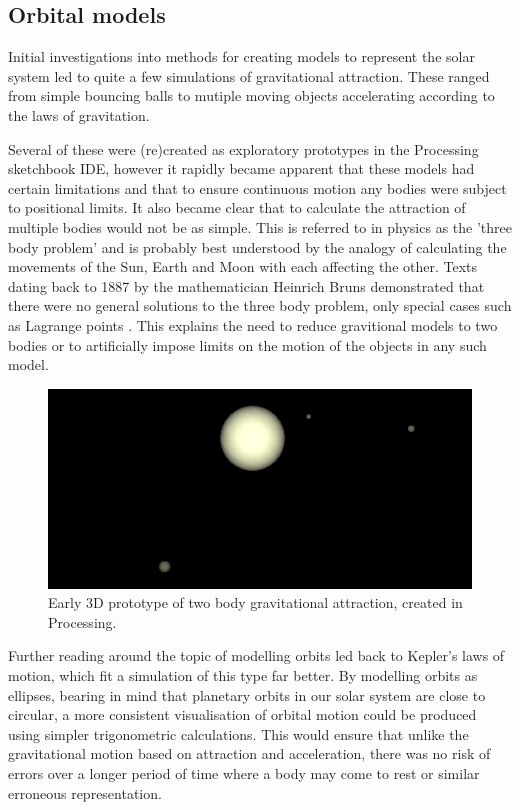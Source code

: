 \documentclass[twoside]{bhamthesis}
\begin{document}
\subsection{Orbital models}
Initial investigations into methods for creating models to represent the solar system led to quite a few simulations of gravitational attraction. These ranged from simple bouncing balls to mutiple moving objects accelerating according to the laws of gravitation.

Several of these were (re)created as exploratory prototypes in the Processing sketchbook IDE, however it rapidly became apparent that these models had certain limitations and that to ensure continuous motion any bodies were subject to positional limits. It also became clear that to calculate the attraction of multiple bodies would not be as simple. This is referred to in physics as the 'three body problem' and is probably best understood by the analogy of calculating the movements of the Sun, Earth and Moon with each affecting the other. Texts dating back to 1887  by the mathematician Heinrich Bruns demonstrated that there were no general solutions to the three body problem, only special cases such as Lagrange points \cite{oconnor_bruns_????}. This explains the need to reduce gravitional models to two bodies or to artificially impose limits on the motion of the objects in any such model.

\begin{figure}[h!]
  \includegraphics[width=\linewidth]{images/grav_proto.png}
  \caption{Early 3D prototype of two body gravitational attraction, created in Processing.}
  \label{fig:grav_proto}
\end{figure} 

Further reading around the topic of modelling orbits \cite{dvorak_chaos_2005}  led back to Kepler's laws of motion, which fit a simulation of this type far better. By modelling orbits as ellipses, bearing in mind that planetary orbits in our solar system are close to circular, a more consistent visualisation of orbital motion could be produced using simpler trigonometric calculations. This would ensure that unlike the gravitational motion based on attraction and acceleration, there was no risk of errors over a longer period of time where a body may come to rest or similar erroneous representation.
\end{document}
